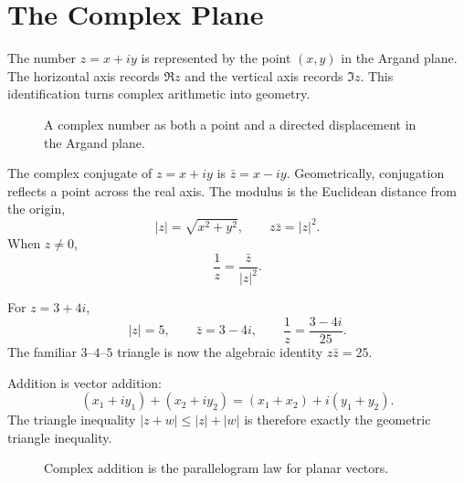 \section{The Complex Plane}
\label{sec:ch5-complex-plane}

The number $z=x+iy$ is represented by the point $(x,y)$ in the Argand plane. The horizontal axis records $\Re z$ and the vertical axis records $\Im z$. This identification turns complex arithmetic into geometry.

\begin{figure}[htbp]
\centering

\caption{A complex number as both a point and a directed displacement in the Argand plane.}
\label{fig:ch5-argand}
\end{figure}

The complex conjugate of $z=x+iy$ is $\bar z=x-iy$. Geometrically, conjugation reflects a point across the real axis. The modulus is the Euclidean distance from the origin,
\[
|z|=\sqrt{x^2+y^2},
\qquad z\bar z=|z|^2.
\]
When $z\neq0$,
\[
\frac{1}{z}=\frac{\bar z}{|z|^2}.
\]

\begin{workedexample}
For $z=3+4i$,
\[
|z|=5,\qquad \bar z=3-4i,\qquad \frac1z=\frac{3-4i}{25}.
\]
The familiar $3$--$4$--$5$ triangle is now the algebraic identity $z\bar z=25$.
\end{workedexample}

Addition is vector addition:
\[
(x_1+iy_1)+(x_2+iy_2)=(x_1+x_2)+i(y_1+y_2).
\]
The triangle inequality $|z+w|\leq |z|+|w|$ is therefore exactly the geometric triangle inequality.

\begin{figure}[htbp]
\centering

\caption{Complex addition is the parallelogram law for planar vectors.}
\label{fig:ch5-addition}
\end{figure}
